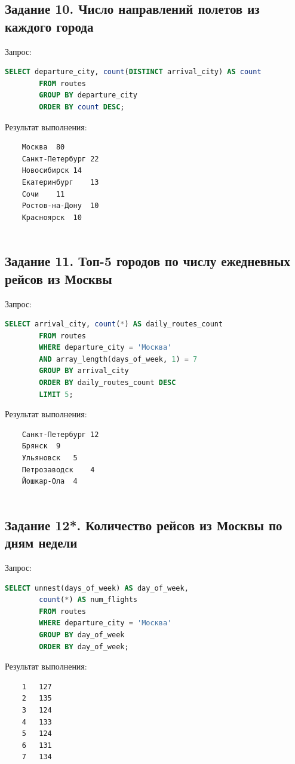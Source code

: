 \documentclass{bmstu-sob}
\begin{document}
	\subsection{Задание 10. Число направлений полетов из каждого города}
	Запрос:
	\begin{lstlisting}[language=SQL]
		SELECT departure_city, count(DISTINCT arrival_city) AS count
		FROM routes
		GROUP BY departure_city
		ORDER BY count DESC;
	\end{lstlisting}
	Результат выполнения:
	\begin{lstlisting}
	Москва	80
	Санкт-Петербург	22
	Новосибирск	14
	Екатеринбург	13
	Сочи	11
	Ростов-на-Дону	10
	Красноярск	10
	
	\end{lstlisting}
	
	\subsection{Задание 11. Топ-5 городов по числу ежедневных рейсов из Москвы}
	Запрос:
	\begin{lstlisting}[language=SQL]
		SELECT arrival_city, count(*) AS daily_routes_count
		FROM routes
		WHERE departure_city = 'Москва' 
		AND array_length(days_of_week, 1) = 7
		GROUP BY arrival_city
		ORDER BY daily_routes_count DESC
		LIMIT 5;
	\end{lstlisting}
	Результат выполнения:
	\begin{lstlisting}
	Санкт-Петербург	12
	Брянск	9
	Ульяновск	5
	Петрозаводск	4
	Йошкар-Ола	4
	
	\end{lstlisting}
	
	\subsection{Задание 12*. Количество рейсов из Москвы по дням недели}
	Запрос:
	\begin{lstlisting}[language=SQL]
		SELECT unnest(days_of_week) AS day_of_week,
		count(*) AS num_flights
		FROM routes
		WHERE departure_city = 'Москва'
		GROUP BY day_of_week
		ORDER BY day_of_week;
	\end{lstlisting}
	Результат выполнения:
	\begin{lstlisting}
	1	127
	2	135
	3	124
	4	133
	5	124
	6	131
	7	134
	
	\end{lstlisting}
	
\end{document}
